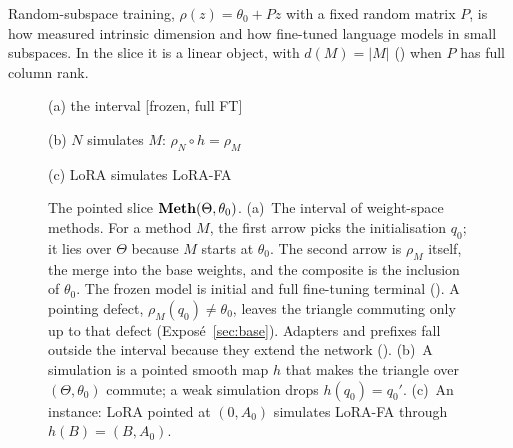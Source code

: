 Random-subspace training, $\rho(z)=\theta_0+Pz$ with a fixed random matrix $P$, is how \citet{li2018measuring} measured
intrinsic dimension and how \citet{aghajanyan2020intrinsic} fine-tuned language models in small subspaces. In the slice it
is a linear object, with $d(M)=\lvert M\rvert$ () when $P$ has full column rank.

\begin{figure}[tbp]
\centering
{\small
{}}

\smallskip
{\sffamily\footnotesize\color{inkgray}(a) the interval [frozen, full FT]}

\bigskip
\begin{minipage}[b]{0.42\linewidth}\centering
{\small
{}}

\smallskip
{\sffamily\footnotesize\color{inkgray}(b) $N$ simulates $M$: $\rho_N\circ h=\rho_M$}
\end{minipage}\hfill
\begin{minipage}[b]{0.56\linewidth}\centering
{\small
{}}

\smallskip
{\sffamily\footnotesize\color{inkgray}(c) LoRA simulates LoRA-FA}
\end{minipage}
\caption{The pointed slice $\mathbf{Meth}(\Theta,\theta_0)$.
(a)~The interval of weight-space methods. For a method $M$, the first arrow picks the initialisation $q_0$; it lies over
$\Theta$ because $M$ starts at $\theta_0$. The second arrow is $\rho_M$ itself, the merge into the base weights, and the
composite is the inclusion of $\theta_0$. The frozen model is initial and full fine-tuning terminal
(). A pointing defect, $\rho_M(q_0)\neq\theta_0$, leaves the triangle commuting only up to that
defect (Exposé~\ref{sec:base}). Adapters and prefixes fall outside the interval because they extend the network
().
(b)~A simulation is a pointed smooth map $h$ that makes the triangle over $(\Theta,\theta_0)$ commute; a weak simulation
drops $h(q_0)=q_0'$.
(c)~An instance: LoRA pointed at $(0,A_0)$ simulates LoRA-FA through $h(B)=(B,A_0)$.}
\label{fig:interval}
\end{figure}

